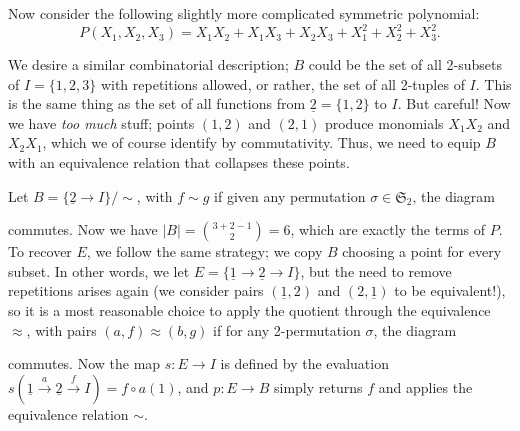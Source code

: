 Now consider the following slightly more complicated symmetric polynomial:
\[
P(X_1,X_2,X_3) = X_1X_2 + X_1X_3 + X_2X_3 + X_1^2 + X_2^2 + X_3^2.
\]

We desire a similar combinatorial description; $B$ could be the set of all 2-subsets of $I=\{1,2,3\}$ with repetitions allowed, or rather, the set of all 2-tuples of $I$. This is the same thing as the set of all functions from $\underline{2}=\{1,2\}$ to $I$. But careful! Now we have \emph{too much} stuff; points $(1,2)$ and $(2,1)$ produce monomials $X_1X_2$ and $X_2X_1$, which we of course identify by commutativity. Thus, we need to equip $B$ with an equivalence relation that collapses these points.

Let $B=\{\underline{2}\to I\}/\sim$, with $f\sim g$ if given any permutation $\sigma\in\mathfrak{S}_2$, the diagram

\begin{figure}[!ht]
\centering
{}
\end{figure}

commutes. Now we have $|B|=\binom{3+2-1}{2}=6$, which are exactly the terms of $P$. To recover $E$, we follow the same strategy; we copy $B$ choosing a point for every subset. In other words, we let $E=\{\underline{1}\to\underline{2}\to I\}$, but the need to remove repetitions arises again (we consider pairs $(\underline{1},2)$ and $(2,\underline{1})$ to be equivalent!), so it is a most reasonable choice to apply the quotient through the equivalence $\approx$, with pairs $(a,f)\approx(b,g)$ if for any 2-permutation $\sigma$, the diagram

\begin{figure}[!ht]
\centering
{}
\end{figure}

commutes. Now the map $s:E\to I$ is defined by the evaluation $s(\underline{1}\overset{a}{\to}\underline{2}\overset{f}{\to} I) = f\circ a(1)$, and $p:E\to B$ simply returns $f$ and applies the equivalence relation $\sim$.

